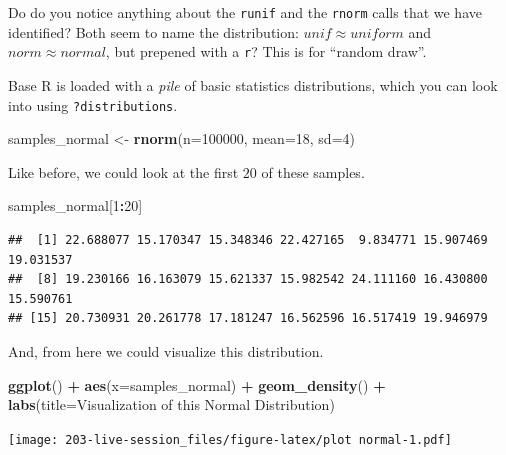 \documentclass[
]{book}
\newenvironment{Shaded}{\begin{snugshade}}{\end{snugshade}}
\newcommand{\AttributeTok}[1]{\textcolor[rgb]{0.13,0.29,0.53}{#1}}
\newcommand{\DecValTok}[1]{\textcolor[rgb]{0.00,0.00,0.81}{#1}}
\newcommand{\FunctionTok}[1]{\textcolor[rgb]{0.13,0.29,0.53}{\textbf{#1}}}
\newcommand{\NormalTok}[1]{#1}
\newcommand{\OtherTok}[1]{\textcolor[rgb]{0.56,0.35,0.01}{#1}}
\newcommand{\SpecialCharTok}[1]{\textcolor[rgb]{0.81,0.36,0.00}{\textbf{#1}}}
\newcommand{\StringTok}[1]{\textcolor[rgb]{0.31,0.60,0.02}{#1}}
\theoremstyle{definition}
\theoremstyle{definition}
\theoremstyle{definition}
\theoremstyle{definition}
\theoremstyle{remark}
\begin{document}
Do do you notice anything about the \texttt{runif} and the \texttt{rnorm} calls that we have identified? Both seem to name the distribution: \(unif \approx uniform\) and \(norm \approx normal\), but prepened with a \texttt{r}? This is for ``random draw''.

Base R is loaded with a \emph{pile} of basic statistics distributions, which you can look into using \texttt{?distributions}.

\begin{Shaded}
\begin{Highlighting}[]
\NormalTok{samples\_normal }\OtherTok{\textless{}{-}} \FunctionTok{rnorm}\NormalTok{(}\AttributeTok{n=}\DecValTok{100000}\NormalTok{, }\AttributeTok{mean=}\DecValTok{18}\NormalTok{, }\AttributeTok{sd=}\DecValTok{4}\NormalTok{)}
\end{Highlighting}
\end{Shaded}

Like before, we could look at the first \(20\) of these samples.

\begin{Shaded}
\begin{Highlighting}[]
\NormalTok{samples\_normal[}\DecValTok{1}\SpecialCharTok{:}\DecValTok{20}\NormalTok{]}
\end{Highlighting}
\end{Shaded}

\begin{verbatim}
##  [1] 22.688077 15.170347 15.348346 22.427165  9.834771 15.907469 19.031537
##  [8] 19.230166 16.163079 15.621337 15.982542 24.111160 16.430800 15.590761
## [15] 20.730931 20.261778 17.181247 16.562596 16.517419 19.946979
\end{verbatim}

And, from here we could visualize this distribution.

\begin{Shaded}
\begin{Highlighting}[]
\FunctionTok{ggplot}\NormalTok{() }\SpecialCharTok{+} 
  \FunctionTok{aes}\NormalTok{(}\AttributeTok{x=}\NormalTok{samples\_normal) }\SpecialCharTok{+} 
  \FunctionTok{geom\_density}\NormalTok{() }\SpecialCharTok{+} 
  \FunctionTok{labs}\NormalTok{(}\AttributeTok{title=}\StringTok{\textquotesingle{}Visualization of this Normal Distribution\textquotesingle{}}\NormalTok{)}
\end{Highlighting}
\end{Shaded}

\texttt{[image: 203-live-session\_files/figure-latex/plot normal-1.pdf]}
\end{document}
